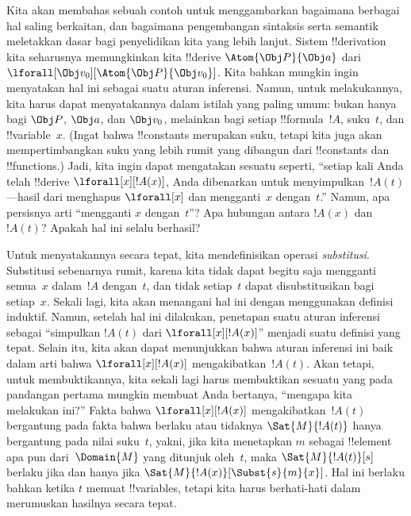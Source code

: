 \documentclass[../../../include/open-logic-section]{subfiles}
\begin{document}


Kita akan membahas sebuah contoh untuk menggambarkan bagaimana berbagai hal
saling berkaitan, dan bagaimana pengembangan sintaksis serta semantik
meletakkan dasar bagi penyelidikan kita yang lebih lanjut. Sistem
!!{derivation} kita seharusnya memungkinkan kita !!{derive}
$\Atom{\Obj P}{\Obj a}$ dari $\lforall[\Obj v_0][\Atom{\Obj P}{\Obj v_0}]$.
Kita bahkan mungkin ingin menyatakan hal ini sebagai suatu aturan inferensi.
Namun, untuk melakukannya, kita harus dapat menyatakannya dalam istilah yang
paling umum: bukan hanya bagi $\Obj P$, $\Obj a$, dan $\Obj v_0$, melainkan
bagi setiap !!{formula}~$!A$, suku~$t$, dan !!{variable}~$x$. (Ingat bahwa
!!{constant}s merupakan suku, tetapi kita juga akan mempertimbangkan suku yang
lebih rumit yang dibangun dari !!{constant}s dan !!{function}s.) Jadi, kita
ingin dapat mengatakan sesuatu seperti, ``setiap kali Anda telah !!{derive}
$\lforall[x][!A(x)]$, Anda dibenarkan untuk menyimpulkan~$!A(t)$---hasil dari
menghapus $\lforall[x]$ dan mengganti~$x$ dengan~$t$.'' Namun, apa persisnya
arti ``mengganti $x$ dengan~$t$''? Apa hubungan antara $!A(x)$ dan~$!A(t)$?
Apakah hal ini selalu berhasil?

Untuk menyatakannya secara tepat, kita mendefinisikan operasi
\emph{substitusi}. Substitusi sebenarnya rumit, karena kita tidak dapat begitu
saja mengganti semua~$x$ dalam~$!A$ dengan~$t$, dan tidak setiap~$t$ dapat
disubstitusikan bagi setiap~$x$. Sekali lagi, kita akan menangani hal ini
dengan menggunakan definisi induktif. Namun, setelah hal ini dilakukan,
penetapan suatu aturan inferensi sebagai ``simpulkan $!A(t)$ dari
$\lforall[x][!A(x)]$'' menjadi suatu definisi yang tepat. Selain itu, kita
akan dapat menunjukkan bahwa aturan inferensi ini baik dalam arti bahwa
$\lforall[x][!A(x)]$ mengakibatkan~$!A(t)$. Akan tetapi, untuk membuktikannya,
kita sekali lagi harus membuktikan sesuatu yang pada pandangan pertama mungkin
membuat Anda bertanya, ``mengapa kita melakukan ini?'' Fakta bahwa
$\lforall[x][!A(x)]$ mengakibatkan~$!A(t)$ bergantung pada fakta bahwa berlaku
atau tidaknya $\Sat{M}{!A(t)}$ hanya bergantung pada nilai suku~$t$, yakni,
jika kita menetapkan $m$ sebagai !!{element} apa pun dari~$\Domain{M}$ yang
ditunjuk oleh~$t$, maka $\Sat{M}{!A(t)}[s]$ berlaku jika dan hanya jika
$\Sat{M}{!A(x)}[\Subst{s}{m}{x}]$. Hal ini berlaku bahkan ketika $t$ memuat
!!{variable}s, tetapi kita harus berhati-hati dalam merumuskan hasilnya secara
tepat.
\end{document}
